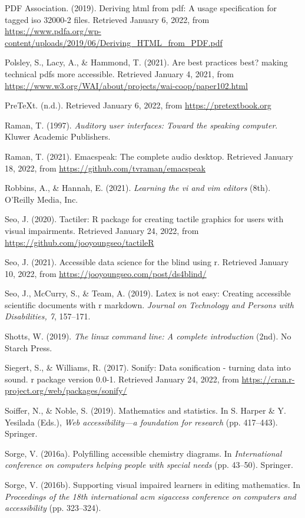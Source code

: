 \documentclass[11pt]{sig-alternate}
\begin{document}
\begin{large}
PDF Association. (2019). Deriving html from pdf: A usage specification for tagged iso 32000-2 files. Retrieved January 6, 2022, from \url{https://www.pdfa.org/wp-content/uploads/2019/06/Deriving\_HTML\_from\_PDF.pdf}

Polsley, S., Lacy, A., \& Hammond, T. (2021). Are best practices best? making technical pdfs more accessible. Retrieved January 4, 2021, from \url{https://www.w3.org/WAI/about/projects/wai-coop/paper102.html}

PreTeXt. (n.d.). Retrieved January 6, 2022, from \url{https://pretextbook.org}

Raman, T. (1997).\textit{ Auditory user interfaces: Toward the speaking computer}. Kluwer Academic Publishers.

Raman, T. (2021). Emacspeak: The complete audio desktop. Retrieved January 18, 2022, from \url{https://github.com/tvraman/emacspeak}

Robbins, A., \& Hannah, E. (2021). \textit{Learning the vi and vim editors }(8th). O’Reilly Media, Inc.

Seo, J. (2020). Tactiler: R package for creating tactile graphics for users with visual impairments. Retrieved January 24, 2022, from \url{https://github.com/jooyoungseo/tactileR}

Seo, J. (2021). Accessible data science for the blind using r. Retrieved January 10, 2022, from \url{https://jooyoungseo.com/post/ds4blind/}

Seo, J., McCurry, S., \& Team, A. (2019). Latex is not easy: Creating accessible scientific documents with r markdown. \textit{Journal on Technology and Persons with Disabilities, 7}, 157–171.

Shotts, W. (2019). \textit{The linux command line: A complete introduction }(2nd). No Starch Press.

Siegert, S., \& Williams, R. (2017). Sonify: Data sonification - turning data into sound. r package version 0.0-1. Retrieved January 24, 2022, from \url{https://cran.r-project.org/web/packages/sonify/}

Soiffer, N., \& Noble, S. (2019). Mathematics and statistics. In S. Harper \& Y. Yesilada (Eds.),\textit{ Web accessibility—a foundation for research} (pp. 417–443). Springer.

Sorge, V. (2016a). Polyfilling accessible chemistry diagrams. In \textit{International conference on computers helping people with special needs }(pp. 43–50). Springer.

Sorge, V. (2016b). Supporting visual impaired learners in editing mathematics. In \textit{Proceedings of the 18th international acm sigaccess conference on computers and accessibility} (pp. 323–324). 


\end{large}
\end{document}
